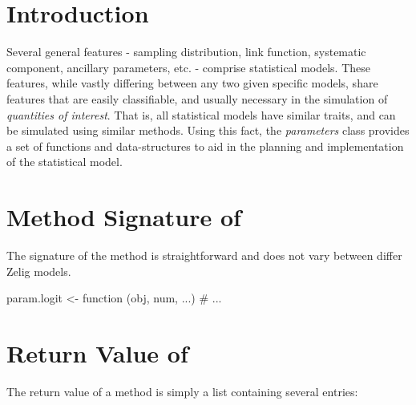 \section{Introduction}
\label{section:param-intro}

Several general features - sampling distribution, link function,
systematic component, ancillary parameters, etc. - comprise
statistical models.  These features, while vastly differing between
any two given specific models, share features that are easily
classifiable, and usually necessary in the simulation of
\emph{quantities of interest}.  That is, all statistical models have
similar traits, and can be simulated using similar methods.  Using
this fact, the \emph{parameters} class provides a set of functions
and data-structures to aid in the planning and implementation of 
the statistical model.

\section{Method Signature of }

The signature of the  method is straightforward and does not vary between differ Zelig models.

\begin{Code}
param.logit <- function (obj, num, ...) {
  # ...
}
\end{Code}

\section{Return Value of }

The return value of a  method is simply a list containing several entries:

